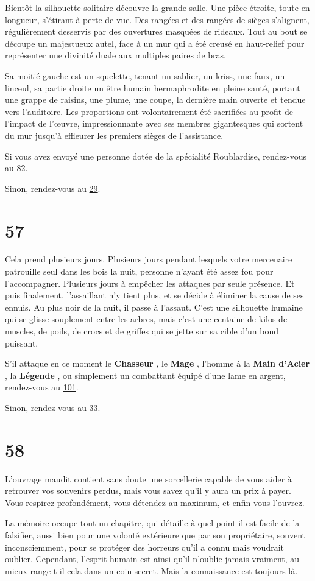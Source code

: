 \documentclass{report}
\newcommand{\gsection}[1]{
    \section{#1}
    \label{section-#1}
}
\newcommand{\glink}[1]{\hyperref[section-#1]{#1}}
\newcommand{\hero}[1]{
    \textbf{#1}
}
\begin{document}
Bientôt la silhouette solitaire découvre la grande salle. Une pièce étroite, toute en longueur, s'étirant à perte de vue. Des rangées et des rangées de sièges s'alignent, régulièrement desservis par des ouvertures masquées de rideaux. Tout au bout se découpe un majestueux autel, face à un mur qui a été creusé en haut-relief pour représenter une divinité duale aux multiples paires de bras.

Sa moitié gauche est un squelette, tenant un sablier, un kriss, une faux, un linceul, sa partie droite un être humain hermaphrodite en pleine santé, portant une grappe de raisins, une plume, une coupe, la dernière main ouverte et tendue vers l'auditoire. Les proportions ont volontairement été sacrifiées au profit de l'impact de l’œuvre, impressionnante avec ses membres gigantesques qui sortent du mur jusqu'à effleurer les premiers sièges de l'assistance.

Si vous avez envoyé une personne dotée de la spécialité Roublardise, rendez-vous au \glink{82}.

Sinon, rendez-vous au \glink{29}.

\gsection{57}

Cela prend plusieurs jours. Plusieurs jours pendant lesquels votre mercenaire patrouille seul dans les bois la nuit, personne n'ayant été assez fou pour l'accompagner. Plusieurs jours à empêcher les attaques par seule présence. Et puis finalement, l'assaillant n'y tient plus, et se décide à éliminer la cause de ses ennuis. Au plus noir de la nuit, il passe à l'assaut. C'est une silhouette humaine qui se glisse souplement entre les arbres, mais c'est une centaine de kilos de muscles, de poils, de crocs et de griffes qui se jette sur sa cible d'un bond puissant. 

S'il attaque en ce moment le \hero{Chasseur}, le \hero{Mage}, l'homme à la \hero{Main d'Acier}, la \hero{Légende}, ou simplement un combattant équipé d'une lame en argent, rendez-vous au \glink{101}.

Sinon, rendez-vous au \glink{33}.

\gsection{58}

L'ouvrage maudit contient sans doute une sorcellerie capable de vous aider à retrouver vos souvenirs perdus, mais vous savez qu'il y aura un prix à payer. Vous respirez profondément, vous détendez au maximum, et enfin vous l'ouvrez.

La mémoire occupe tout un chapitre, qui détaille à quel point il est facile de la falsifier, aussi bien pour une volonté extérieure que par son propriétaire, souvent inconsciemment, pour se protéger des horreurs qu'il a connu mais voudrait oublier. Cependant, l'esprit humain est ainsi qu'il n'oublie jamais vraiment, au mieux range-t-il cela dans un coin secret. Mais la connaissance est toujours là.
\end{document}
